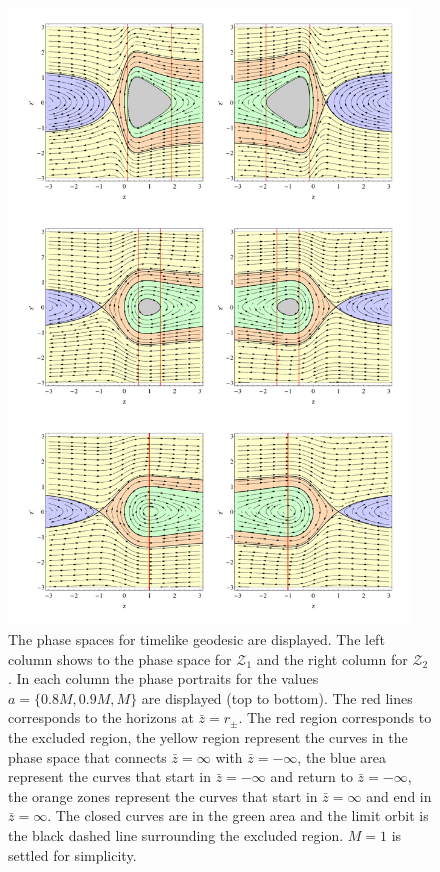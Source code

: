   \begin{figure}[htp!]  
\begin{center}
 \centerline{\includegraphics[width=0.95\textwidth]{img/Chapter3/Phase.png}}
 \end{center}
 \vspace{-1.5cm}
 \caption{The phase spaces for timelike geodesic are displayed. The left column shows to the phase space for $\mathcal{Z}_1$ and the right column for $\mathcal{Z}_2$. In each column the phase portraits for the values $a=\{0.8 M,0.9 M,M\}$ are displayed (top to bottom). The red lines corresponds to the horizons at $\bar z=r_\pm$. The red region corresponds to the excluded region, the yellow region represent the curves in the phase space that connects $\bar z= \infty$ with $\bar z= -\infty$, the blue area represent the curves that start in $\bar z=-\infty$ and return to $\bar z=-\infty$, the orange zones represent the curves that start in $\bar z=\infty$ and end in $\bar z=\infty$. The closed curves are in the green area and the limit orbit is the black dashed line surrounding the excluded region. $M=1$ is settled for simplicity.}
 \label{fig:Phasediagrams}
\end{figure}  
